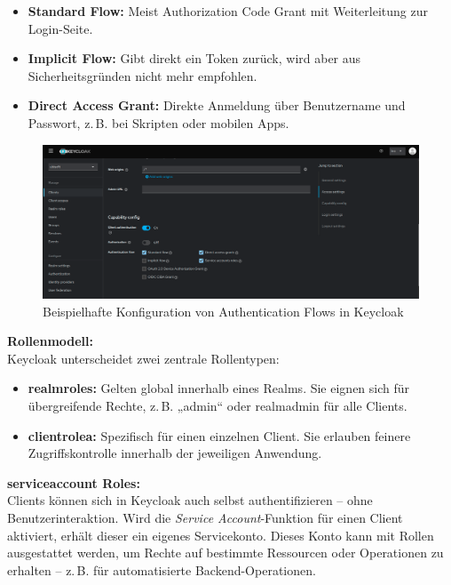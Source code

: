 \documentclass[a4paper,12pt]{article}
\begin{document}
	\begin{itemize}
		\item \textbf{Standard Flow:} Meist Authorization Code Grant mit Weiterleitung zur Login-Seite.
		\item \textbf{Implicit Flow:} Gibt direkt ein Token zurück, wird aber aus Sicherheitsgründen nicht mehr empfohlen.
		\item \textbf{Direct Access Grant:} Direkte Anmeldung über Benutzername und Passwort, z.\,B. bei Skripten oder mobilen Apps.
	\end{itemize}
	
	\begin{figure}[H]
		\centering
		\includegraphics[width=0.9\linewidth]{Bilder/screenshot013}
		\caption{Beispielhafte Konfiguration von Authentication Flows in Keycloak}
		\label{fig:screenshot013}
	\end{figure}
	\vspace{0.5em}
	\textbf{Rollenmodell:}\\
	Keycloak unterscheidet zwei zentrale Rollentypen:
	
	\begin{itemize}
		\item \textbf{\gls{realmrole}s:} Gelten global innerhalb eines Realms. Sie eignen sich für übergreifende Rechte, z.\,B. „admin“ oder \gls{realmadmin} für alle Clients.
		\item \textbf{\gls{clientrole}a:} Spezifisch für einen einzelnen Client. Sie erlauben feinere Zugriffskontrolle innerhalb der jeweiligen Anwendung.
	\end{itemize}
	\textbf{\gls{serviceaccount} Roles:}\\
	Clients können sich in Keycloak auch selbst authentifizieren – ohne Benutzerinteraktion. Wird die \textit{Service Account}-Funktion für einen Client aktiviert, erhält dieser ein eigenes Servicekonto. Dieses Konto kann mit Rollen ausgestattet werden, um Rechte auf bestimmte Ressourcen oder Operationen zu erhalten – z.\,B. für automatisierte Backend-Operationen.
	
\end{document}
